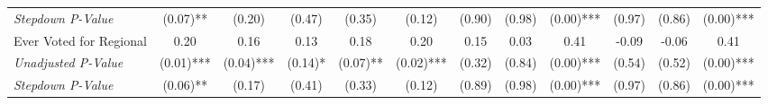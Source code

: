 \begin{tabular}{l c c c c c c c c c c c}
\quad \textit{Stepdown P-Value} & (0.07)** & (0.20) & (0.47) & (0.35) & (0.12) & (0.90) & (0.98) & (0.00)*** & (0.97) & (0.86) & (0.00)*** \\
Ever Voted for Regional & 0.20 & 0.16 & 0.13 & 0.18 & 0.20 & 0.15 & 0.03 & 0.41 & -0.09 & -0.06 & 0.41 \\
\quad \textit{Unadjusted P-Value} & (0.01)*** & (0.04)*** & (0.14)* & (0.07)** & (0.02)*** & (0.32) & (0.84) & (0.00)*** & (0.54) & (0.52) & (0.00)*** \\
\quad \textit{Stepdown P-Value} & (0.06)** & (0.17) & (0.41) & (0.33) & (0.12) & (0.89) & (0.98) & (0.00)*** & (0.97) & (0.86) & (0.00)*** \\
\bottomrule
\end{tabular}
